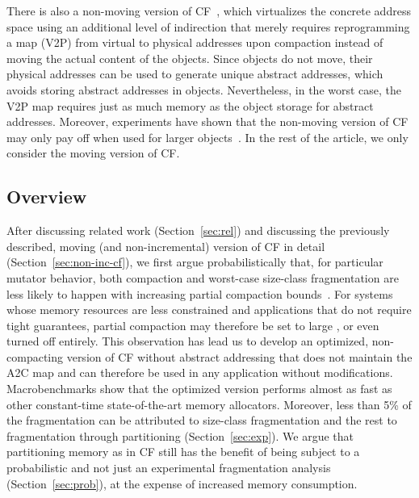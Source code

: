 \documentclass{amsart}
\begin{document}
There is also a non-moving version of CF~\cite{USENIX08}, which
virtualizes the concrete address space using an additional level of
indirection that merely requires reprogramming a map (V2P) from
virtual to physical addresses upon compaction instead of moving the
actual content of the objects.  Since objects do not move, their
physical addresses can be used to generate unique abstract addresses,
which avoids storing abstract addresses in objects.  Nevertheless, in
the worst case, the V2P map requires just as much memory as the object
storage for abstract addresses.  Moreover, experiments have shown that
the non-moving version of CF may only pay off when used for larger
objects~\cite{USENIX08}.  In the rest of the article, we only consider
the moving version of CF.

\subsection{Overview}

After discussing related work (Section~\ref{sec:rel}) and discussing
the previously described, moving (and non-incremental) version of CF
in detail (Section~\ref{sec:non-inc-cf}), we first argue
probabilistically that, for particular mutator behavior, both compaction and
worst-case size-class fragmentation are less likely to happen with
increasing partial compaction bounds~.  For systems whose
memory resources are less constrained and applications that do not
require tight guarantees, partial compaction may therefore be set to
large , or even turned off entirely.  This observation has
lead us to develop an optimized, non-compacting version of CF without
abstract addressing that does not maintain the A2C map and can
therefore be used in any application without modifications.
Macrobenchmarks show that the optimized version performs almost as
fast as other constant-time state-of-the-art memory
allocators. Moreover, less than 5\% of the fragmentation can be
attributed to size-class fragmentation and the rest to fragmentation
through partitioning (Section~\ref{sec:exp}).  We argue that
partitioning memory as in CF still has the benefit of being subject to
a probabilistic and not just an experimental fragmentation analysis
(Section~\ref{sec:prob}), at the expense of increased memory
consumption.
\end{document}
